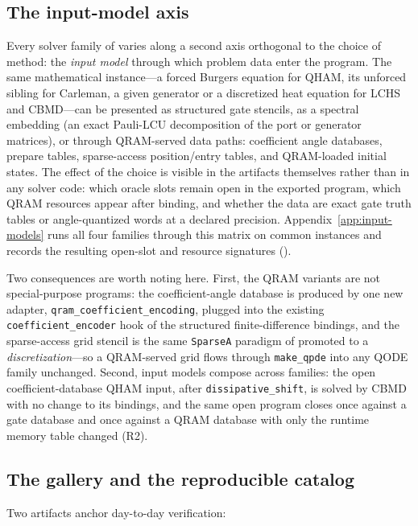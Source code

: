 \subsection{The input-model axis}
\label{sec:input-models}

Every solver family of  varies along a second axis
orthogonal to the choice of method: the \emph{input model} through which
problem data enter the program.  The same mathematical instance---a
forced Burgers equation for QHAM, its unforced sibling for Carleman, a
given generator or a discretized heat equation for LCHS and CBMD---can be
presented as structured gate stencils, as a spectral embedding (an exact
Pauli-LCU decomposition of the port or generator matrices), or through
QRAM-served data paths: coefficient angle databases, prepare tables,
sparse-access position/entry tables, and QRAM-loaded initial states.  The
effect of the choice is visible in the artifacts themselves rather than
in any solver code: which oracle slots remain open in the exported
program, which QRAM resources appear after binding, and whether the data
are exact gate truth tables or angle-quantized words at a declared
precision.  Appendix~\ref{app:input-models} runs all four families
through this matrix on common instances and records the resulting
open-slot and resource signatures ().

Two consequences are worth noting here.  First, the QRAM variants are
not special-purpose programs: the coefficient-angle database is produced
by one new adapter, \texttt{qram\_coefficient\_encoding}, plugged into
the existing \texttt{coefficient\_encoder} hook of the structured
finite-difference bindings, and the sparse-access grid stencil is the
same \texttt{SparseA} paradigm of  promoted to a
\emph{discretization}---so a QRAM-served grid flows through
\texttt{make\_qpde} into any QODE family unchanged.  Second, input models
compose across families: the open coefficient-database QHAM input, after
\texttt{dissipative\_shift}, is solved by CBMD with no change to its
bindings, and the same open program closes once against a gate database
and once against a QRAM database with only the runtime memory table
changed (R2).

\subsection{The gallery and the reproducible catalog}
\label{sec:gallery}

Two artifacts anchor day-to-day verification:

